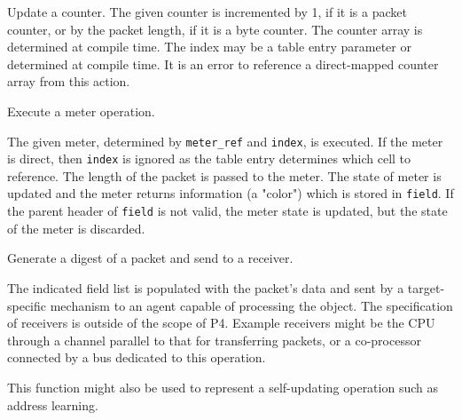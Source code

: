 \documentclass[12pt]{article}
\begin{document}
{ %
Update a counter.
}
{ %
}
{ %
The given counter is incremented by 1, if it is a packet counter, or by the 
packet length, if it is a byte counter.  The counter array is determined 
at compile time.  The index may be a table entry parameter or determined at 
compile time. It is an error to reference a direct-mapped counter array from 
this action.
}


{ %
Execute a meter operation.
}
{ %
}
{ %
The given meter, determined by \texttt{meter_ref} and \texttt{index}, is executed. If the 
meter is direct, then \texttt{index} is ignored as the table entry determines which 
cell to reference. The length of the packet is passed to the meter. The state 
of meter is updated and the meter returns information (a "color") which is 
stored in \texttt{field}. If the parent header of \texttt{field} is not valid, the meter 
state is updated, but the state of the meter is discarded.

}


{ %
Generate a digest of a packet and send to a receiver.
}
{ %
}
{ %
The indicated field list is populated with the packet's data and sent by 
a target-specific mechanism to an agent capable of processing the object. 
 The specification of receivers is outside of the scope of P4. Example receivers 
might be the CPU through a channel parallel to that for transferring packets, 
or a co-processor connected by a bus dedicated to this operation. 

This function might also be used to represent a self-updating operation such 
as address learning.
}

\end{document}
